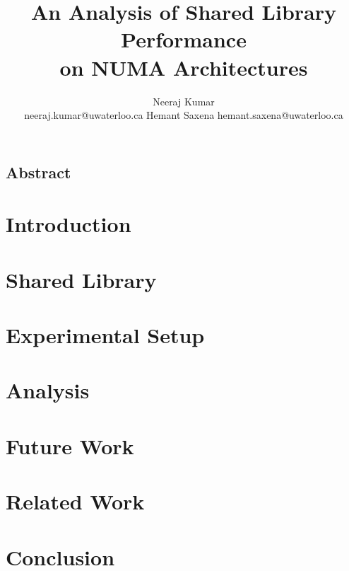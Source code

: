 \documentclass{acm_proc_article-sp}
\title{An Analysis of Shared Library Performance \\ on NUMA Architectures}
\author{
Neeraj Kumar\\
neeraj.kumar@uwaterloo.ca
\alignauthor
Hemant Saxena
hemant.saxena@uwaterloo.ca
}
\begin{document}
\maketitle

\subsection*{Abstract}


\section{Introduction}


%

\section{Shared Library}


\section{Experimental Setup}


\section{Analysis} \label{sec:analysis}


\section{Future Work} \label{sec:future-work}


\section{Related Work}


\section{Conclusion} \label{sec:conclusion}




\end{document}
